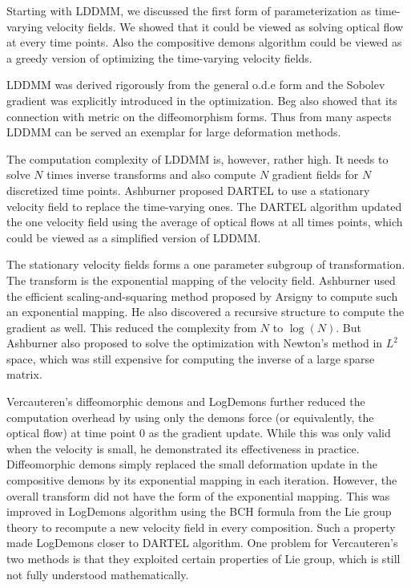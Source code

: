 \documentclass[letterpaper,12pt]{article}
\begin{document}
Starting with LDDMM, we discussed the first form of parameterization as time-varying velocity fields. We showed that it could be viewed as solving optical flow at every time points. Also the compositive demons algorithm could be viewed as a greedy version of optimizing the time-varying velocity fields.

LDDMM was derived rigorously from the general o.d.e form and the Sobolev gradient was explicitly introduced in the optimization. Beg also showed that its connection with metric on the diffeomorphism forms. Thus from many aspects LDDMM can be served an exemplar for large deformation methods.

The computation complexity of LDDMM is, however, rather high. It needs to solve $N$ times inverse transforms and also compute $N$ gradient fields for $N$ discretized time points. Ashburner proposed DARTEL to use a stationary velocity field to replace the time-varying ones. The DARTEL algorithm updated the one velocity field using the average of optical flows at all times points, which could be viewed as a simplified version of LDDMM.  

The stationary velocity fields forms a one parameter subgroup of transformation. The transform is the exponential mapping of the velocity field. Ashburner used the efficient scaling-and-squaring method proposed by Arsigny to compute such an exponential mapping. He also discovered a recursive structure to compute the gradient as well. This reduced the complexity from $N$ to $\log(N)$. But Ashburner also proposed to solve the optimization with Newton's method in $L^2$ space, which was still expensive for computing the inverse of a large sparse matrix.

Vercauteren's diffeomorphic demons and LogDemons further reduced the computation overhead by using only the demons force (or equivalently, the optical flow) at time point 0 as the gradient update. While this was only valid when the velocity is small, he demonstrated its effectiveness in practice. Diffeomorphic demons simply replaced the small deformation update in the compositive demons by its exponential mapping in each iteration. However, the overall transform did not have the form of the exponential mapping. This was improved in LogDemons algorithm using the BCH formula from the Lie group theory to recompute a new velocity field in every composition. Such a property made LogDemons closer to DARTEL algorithm. One problem for Vercauteren's two methods is that they exploited certain properties of Lie group, which is still not fully understood mathematically.
\end{document}
